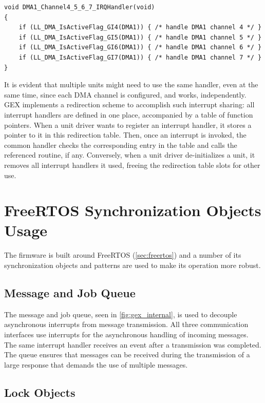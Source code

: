 \begin{verbatim}
void DMA1_Channel4_5_6_7_IRQHandler(void)
{
    if (LL_DMA_IsActiveFlag_GI4(DMA1)) { /* handle DMA1 channel 4 */ }
    if (LL_DMA_IsActiveFlag_GI5(DMA1)) { /* handle DMA1 channel 5 */ }
    if (LL_DMA_IsActiveFlag_GI6(DMA1)) { /* handle DMA1 channel 6 */ }
    if (LL_DMA_IsActiveFlag_GI7(DMA1)) { /* handle DMA1 channel 7 */ }
}
\end{verbatim}

It is evident that multiple units might need to use the same handler, even at the same time, since each \gls{DMA} channel is configured, and works, independently. GEX implements a redirection scheme to accomplish such interrupt sharing: all interrupt handlers are defined in one place, accompanied by a table of function pointers. When a unit driver wants to register an interrupt handler, it stores a pointer to it in this redirection table. Then, once an interrupt is invoked, the common handler checks the corresponding entry in the table and calls the referenced routine, if any. Conversely, when a unit driver de-initializes a unit, it removes all interrupt handlers it used, freeing the redirection table slots for other use.

\section{FreeRTOS Synchronization Objects Usage} \label{sec:rtos_in_gex}

The firmware is built around FreeRTOS (\cref{sec:freertos}) and a number of its synchronization objects and patterns are used to make its operation more robust.

\subsection{Message and Job Queue}

The message and job queue, seen in \cref{fig:gex_internal}, is used to decouple asynchronous interrupts from message transmission. All three communication interfaces use interrupts for the asynchronous handling of incoming messages. The same interrupt handler receives an event after a transmission was completed. The queue ensures that messages can be received during the transmission of a large response that demands the use of multiple messages.

\subsection{Lock Objects}

